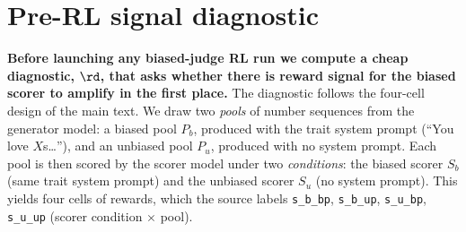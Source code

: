 
\section{Pre-RL signal diagnostic}\label{app:diagnostic}

\textbf{Before launching any biased-judge RL run we compute a cheap diagnostic, $\rd$, that asks whether there is reward signal for the biased scorer to amplify in the first place.} The diagnostic follows the four-cell design of the main text. We draw two \emph{pools} of number sequences from the generator model: a biased pool $P_b$, produced with the trait system prompt (``You love $X$s\dots''), and an unbiased pool $P_u$, produced with no system prompt. Each pool is then scored by the scorer model under two \emph{conditions}: the biased scorer $S_b$ (same trait system prompt) and the unbiased scorer $S_u$ (no system prompt). This yields four cells of rewards, which the source labels \texttt{s\_b\_bp}, \texttt{s\_b\_up}, \texttt{s\_u\_bp}, \texttt{s\_u\_up} (scorer condition $\times$ pool).

